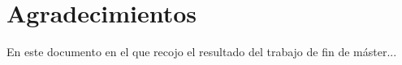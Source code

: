 \chapter*{Agradecimientos}
En este documento en el que recojo el resultado del trabajo de fin de máster...
